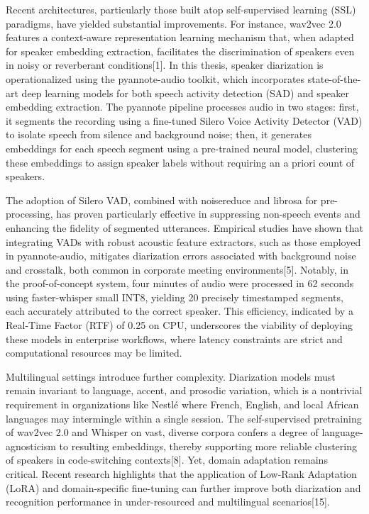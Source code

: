\documentclass[12pt,a4paper]{article}
\begin{document}
Recent architectures, particularly those built atop self-supervised learning (SSL) paradigms, have yielded substantial improvements. For instance, wav2vec 2.0 features a context-aware representation learning mechanism that, when adapted for speaker embedding extraction, facilitates the discrimination of speakers even in noisy or reverberant conditions[1]. In this thesis, speaker diarization is operationalized using the pyannote-audio toolkit, which incorporates state-of-the-art deep learning models for both speech activity detection (SAD) and speaker embedding extraction. The pyannote pipeline processes audio in two stages: first, it segments the recording using a fine-tuned Silero Voice Activity Detector (VAD) to isolate speech from silence and background noise; then, it generates embeddings for each speech segment using a pre-trained neural model, clustering these embeddings to assign speaker labels without requiring an a priori count of speakers.


The adoption of Silero VAD, combined with noisereduce and librosa for pre-processing, has proven particularly effective in suppressing non-speech events and enhancing the fidelity of segmented utterances. Empirical studies have shown that integrating VADs with robust acoustic feature extractors, such as those employed in pyannote-audio, mitigates diarization errors associated with background noise and crosstalk, both common in corporate meeting environments[5]. Notably, in the proof-of-concept system, four minutes of audio were processed in 62 seconds using faster-whisper small INT8, yielding 20 precisely timestamped segments, each accurately attributed to the correct speaker. This efficiency, indicated by a Real-Time Factor (RTF) of 0.25 on CPU, underscores the viability of deploying these models in enterprise workflows, where latency constraints are strict and computational resources may be limited.


Multilingual settings introduce further complexity. Diarization models must remain invariant to language, accent, and prosodic variation, which is a nontrivial requirement in organizations like Nestlé where French, English, and local African languages may intermingle within a single session. The self-supervised pretraining of wav2vec 2.0 and Whisper on vast, diverse corpora confers a degree of language-agnosticism to resulting embeddings, thereby supporting more reliable clustering of speakers in code-switching contexts[8]. Yet, domain adaptation remains critical. Recent research highlights that the application of Low-Rank Adaptation (LoRA) and domain-specific fine-tuning can further improve both diarization and recognition performance in under-resourced and multilingual scenarios[15].
\end{document}
